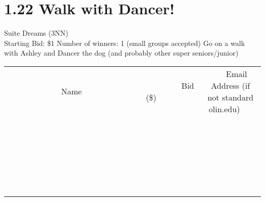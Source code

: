 \documentclass[11pt]{article}
\begin{document}
\section*{1.22 Walk with Dancer!}
Suite Dreams (3NN)
\\
Starting Bid: \$1
\newline
Number of winners: 1 (small groups accepted)
\newline
Go on a walk with Ashley and Dancer the dog (and probably other super seniors/junior)
\\[6ex]
\begin{tabular}{c c c}
~~~~~~~~~~~~~Name~~~~~~~~~~~~~ & ~~~~~~~~~Bid (\$)~~~~~~~~~  & ~~~Email Address (if not standard olin.edu)~~~\\
 & & \\
\hline
 & & \\
\hline
 & & \\
\hline
 & & \\
\hline
 & & \\
\hline
 & & \\
\hline
 & & \\
\hline
 & & \\
\hline
 & & \\
\hline
 & & \\
\hline
 & & \\
\hline
 & & \\
\hline
 & & \\
\hline
 & & \\
\hline
 & & \\
\hline
 & & \\
\hline
 & & \\
\hline
 & & \\
\hline
 & & \\
\hline
 & & \\
\hline
 & & \\
\hline
 & & \\
\hline
 & & \\
\hline
 & & \\
\hline
 & & \\
\hline
 & & \\
\hline
\end{tabular}
\newpage
\end{document}
